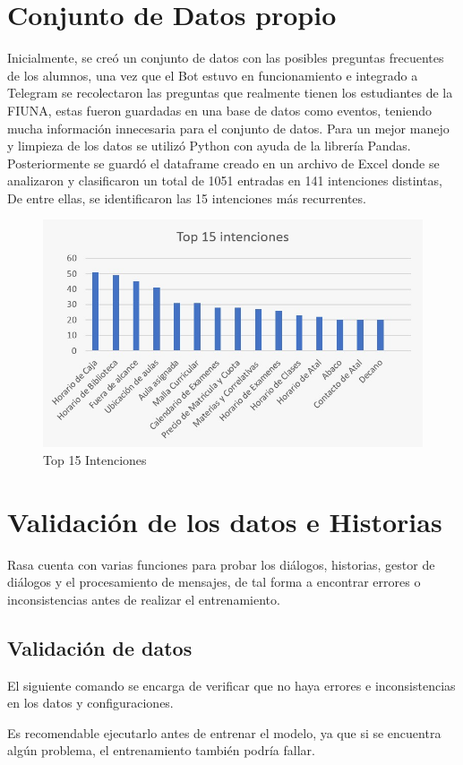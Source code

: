 \section{Conjunto de Datos propio}
Inicialmente, se creó un conjunto de datos con las posibles preguntas frecuentes de los alumnos, una vez que el Bot estuvo en funcionamiento e integrado a Telegram se recolectaron las preguntas que realmente tienen los estudiantes de la FIUNA, estas fueron guardadas en una base de datos como eventos, teniendo mucha información innecesaria para el conjunto de datos. Para un mejor manejo y limpieza de los datos se utilizó Python con ayuda de la librería Pandas. Posteriormente se guardó el dataframe creado en un archivo de Excel donde se analizaron y clasificaron un total de 1051 entradas en 141 intenciones distintas, De entre ellas, se identificaron las 15 intenciones más recurrentes.
\begin{figure}[h!]
    \centering
    \includegraphics[width=\textwidth]{imagenes/cap5/Top15intents.jpeg}   
    \caption{Top 15 Intenciones}
    \label{fig:Top15intents}
\end{figure}

\section{Validación de los datos e Historias}
Rasa cuenta con varias funciones para probar los diálogos, historias, gestor de diálogos y el procesamiento de mensajes, de tal forma a encontrar errores o inconsistencias antes de realizar el entrenamiento.
\subsection{Validación de datos}
El siguiente comando se encarga de verificar que no haya errores e inconsistencias en los datos y configuraciones.
\begin{center}
\end{center}
Es recomendable ejecutarlo antes de entrenar el modelo, ya que si se encuentra algún problema, el entrenamiento también podría fallar.
